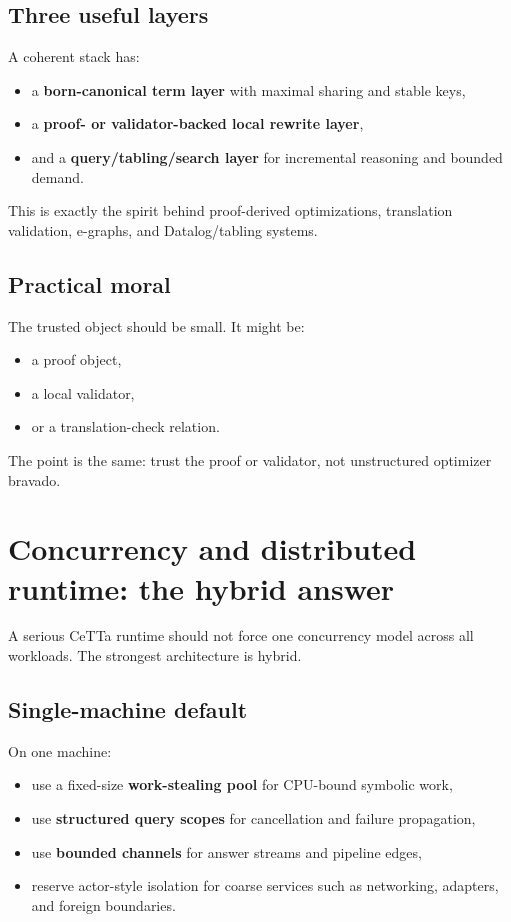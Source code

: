 \documentclass[11pt]{article}
\begin{document}
\subsection{Three useful layers}
A coherent stack has:
\begin{itemize}
  \item a \textbf{born-canonical term layer} with maximal sharing and stable keys,
  \item a \textbf{proof- or validator-backed local rewrite layer},
  \item and a \textbf{query/tabling/search layer} for incremental reasoning and bounded demand.
\end{itemize}

This is exactly the spirit behind proof-derived optimizations, translation validation, e-graphs, and Datalog/tabling systems.

\subsection{Practical moral}
The trusted object should be small. It might be:
\begin{itemize}
  \item a proof object,
  \item a local validator,
  \item or a translation-check relation.
\end{itemize}

The point is the same: trust the proof or validator, not unstructured optimizer bravado.

\section{Concurrency and distributed runtime: the hybrid answer}
A serious CeTTa runtime should not force one concurrency model across all workloads. The strongest architecture is hybrid.

\subsection{Single-machine default}
On one machine:
\begin{itemize}
  \item use a fixed-size \textbf{work-stealing pool} for CPU-bound symbolic work,
  \item use \textbf{structured query scopes} for cancellation and failure propagation,
  \item use \textbf{bounded channels} for answer streams and pipeline edges,
  \item reserve actor-style isolation for coarse services such as networking, adapters, and foreign boundaries.
\end{itemize}
\end{document}
